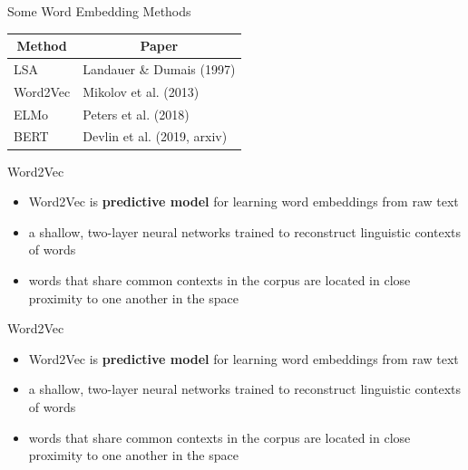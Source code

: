 \documentclass[professionalfonts, xcolor={usenames,svgnames,x11names,table}]{beamer}
\begin{document}
\begin{frame}{Some Word Embedding Methods}
\centering 

\begin{table}[]
\begin{tabular}{ll}
\hline
\multicolumn{1}{c}{Method} & \multicolumn{1}{c}{Paper}   \\ \hline  \hline
LSA                        & Landauer \& Dumais (1997)   \\
Word2Vec                   & Mikolov et al.  (2013)      \\
ELMo                       & Peters et al.  (2018)       \\
BERT                       & Devlin et al. (2019, arxiv) \\ \hline
\end{tabular}
\end{table}

\pause
\begin{alertblock}{Word2Vec}
\begin{itemize}
	\item Word2Vec is  \textbf{predictive model} for learning word embeddings from raw text
	\item  a shallow, two-layer neural networks trained to reconstruct linguistic contexts of words
	\item words that share common contexts in the corpus are located in close proximity to one another in the space
\end{itemize}
\end{alertblock}

\end{frame}

\begin{frame}{Word2Vec}

\begin{itemize}
\item Word2Vec is  \textbf{predictive model} for learning word embeddings from raw text
\item  a shallow, two-layer neural networks trained to reconstruct linguistic contexts of words
\item words that share common contexts in the corpus are located in close proximity to one another in the space
\end{itemize}


\end{frame}
\end{document}
